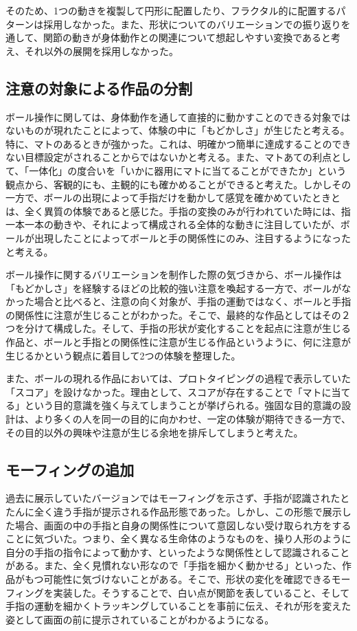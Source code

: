 そのため、1つの動きを複製して円形に配置したり、フラクタル的に配置するパターンは採用しなかった。また、形状についてのバリエーションでの振り返りを通して、関節の動きが身体動作との関連について想起しやすい変換であると考え、それ以外の展開を採用しなかった。

\subsection{注意の対象による作品の分割}
ボール操作に関しては、身体動作を通して直接的に動かすことのできる対象ではないものが現れたことによって、体験の中に「もどかしさ」が生じたと考える。特に、マトのあるときが強かった。これは、明確かつ簡単に達成することのできない目標設定がされることからではないかと考える。また、マトあての利点として、「一体化」の度合いを「いかに器用にマトに当てることができたか」という観点から、客観的にも、主観的にも確かめることができると考えた。しかしその一方で、ボールの出現によって手指だけを動かして感覚を確かめていたときとは、全く異質の体験であると感じた。手指の変換のみが行われていた時には、指一本一本の動きや、それによって構成される全体的な動きに注目していたが、ボールが出現したことによってボールと手の関係性にのみ、注目するようになったと考える。

ボール操作に関するバリエーションを制作した際の気づきから、ボール操作は「もどかしさ」を経験するほどの比較的強い注意を喚起する一方で、ボールがなかった場合と比べると、注意の向く対象が、手指の運動ではなく、ボールと手指の関係性に注意が生じることがわかった。そこで、最終的な作品としてはその２つを分けて構成した。そして、手指の形状が変化することを起点に注意が生じる作品と、ボールと手指との関係性に注意が生じる作品というように、何に注意が生じるかという観点に着目して2つの体験を整理した。

また、ボールの現れる作品においては、プロトタイピングの過程で表示していた「スコア」を設けなかった。理由として、スコアが存在することで「マトに当てる」という目的意識を強く与えてしまうことが挙げられる。強固な目的意識の設計は、より多くの人を同一の目的に向かわせ、一定の体験が期待できる一方で、その目的以外の興味や注意が生じる余地を排斥してしまうと考えた。

\subsection{モーフィングの追加}
過去に展示していたバージョンではモーフィングを示さず、手指が認識されたとたんに全く違う手指が提示される作品形態であった。しかし、この形態で展示した場合、画面の中の手指と自身の関係性について意図しない受け取られ方をすることに気づいた。つまり、全く異なる生命体のようなものを、操り人形のように自分の手指の指令によって動かす、といったような関係性として認識されることがある。また、全く見慣れない形なので「手指を細かく動かせる」といった、作品がもつ可能性に気づけないことがある。そこで、形状の変化を確認できるモーフィングを実装した。そうすることで、白い点が関節を表していること、そして手指の運動を細かくトラッキングしていることを事前に伝え、それが形を変えた姿として画面の前に提示されていることがわかるようになる。

